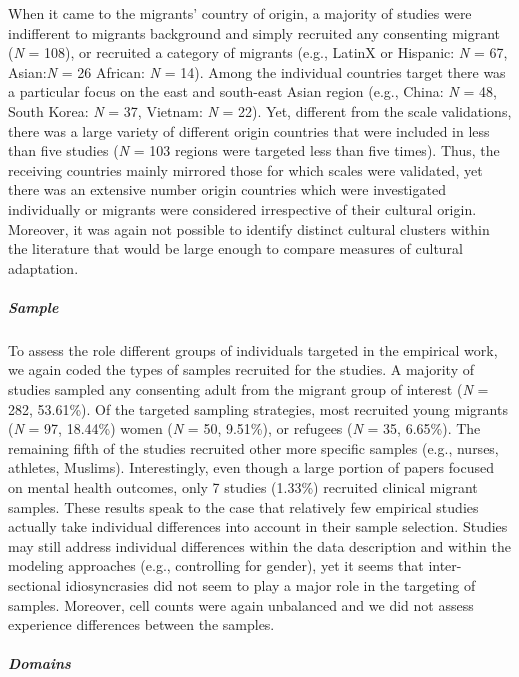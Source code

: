 When it came to the migrants' country of origin, a majority of studies
were indifferent to migrants background and simply recruited any
consenting migrant (\textit{N} = 108), or recruited a category of
migrants (e.g., LatinX or Hispanic: \textit{N} = 67, Asian:\textit{N} =
26 African: \textit{N} = 14). Among the individual countries target
there was a particular focus on the east and south-east Asian region
(e.g., China: \textit{N} = 48, South Korea: \textit{N} = 37, Vietnam:
\textit{N} = 22). Yet, different from the scale validations, there was a
large variety of different origin countries that were included in less
than five studies (\textit{N} = 103 regions were targeted less than five
times). Thus, the receiving countries mainly mirrored those for which
scales were validated, yet there was an extensive number origin
countries which were investigated individually or migrants were
considered irrespective of their cultural origin. Moreover, it was again
not possible to identify distinct cultural clusters within the
literature that would be large enough to compare measures of cultural
adaptation.

\subparagraph{Sample}

To assess the role different groups of individuals targeted in the
empirical work, we again coded the types of samples recruited for the
studies. A majority of studies sampled any consenting adult from the
migrant group of interest (\textit{N} = 282, 53.61\%). Of the targeted
sampling strategies, most recruited young migrants (\textit{N} = 97,
18.44\%) women (\textit{N} = 50, 9.51\%), or refugees (\textit{N} = 35,
6.65\%). The remaining fifth of the studies recruited other more
specific samples (e.g., nurses, athletes, Muslims). Interestingly, even
though a large portion of papers focused on mental health outcomes, only
7 studies (1.33\%) recruited clinical migrant samples. These results
speak to the case that relatively few empirical studies actually take
individual differences into account in their sample selection. Studies
may still address individual differences within the data description and
within the modeling approaches (e.g., controlling for gender), yet it
seems that inter-sectional idiosyncrasies did not seem to play a major
role in the targeting of samples. Moreover, cell counts were again
unbalanced and we did not assess experience differences between the
samples.

\subparagraph{Domains}

